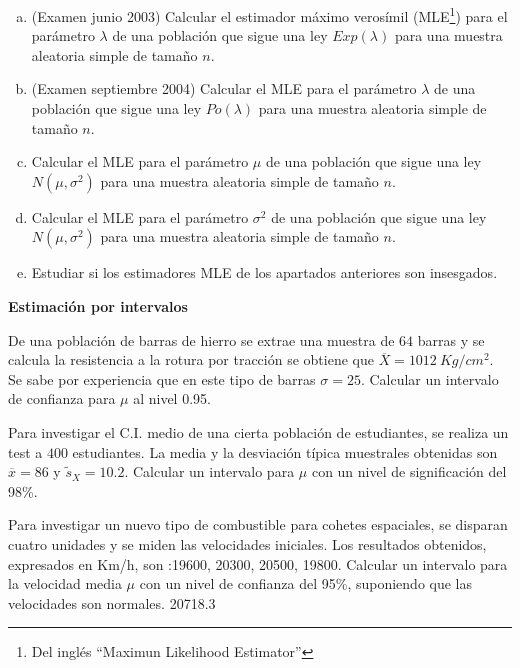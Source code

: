 \documentclass[12pt]{article}
\begin{document}
\begin{prob}
\begin{enumerate}[a)]
\item (Examen junio 2003) Calcular el estimador máximo verosímil (MLE\footnote{Del inglés
 ``Maximun Likelihood  Estimator''}) para el parámetro $\lambda$ de una población que
sigue una ley $Exp(\lambda)$ para una muestra aleatoria simple de tamaño $n$.
\item (Examen septiembre 2004) Calcular el MLE para el parámetro $\lambda$ de una población
que sigue una ley $Po(\lambda)$ para una muestra aleatoria simple de tamaño $n$.
\item  Calcular el MLE para el parámetro $\mu$ de una población
que sigue una ley $N(\mu,\sigma^2)$ para una muestra aleatoria simple de tamaño $n$.
\item  Calcular el MLE para el parámetro $\sigma^2$ de una población
que sigue una ley $N(\mu,\sigma^2)$ para una muestra aleatoria simple de tamaño $n$.
\item Estudiar si los estimadores MLE de los apartados anteriores son insesgados.
\end{enumerate}
\end{prob}




\textbf{Estimación por intervalos}

\begin{prob}
De una población de barras de hierro se extrae una muestra de $64$ barras y  se calcula la
resistencia a la rotura por tracción se obtiene que $\overline{X}=1012\ Kg/cm^{2}$. Se sabe
por experiencia que en este tipo de barras $\sigma=25$. Calcular un intervalo de confianza
para $\mu$ al nivel 0.95. 
\end{prob}

\begin{prob}
Para investigar el C.I. medio de una cierta población de estudiantes, se realiza un test a
$400$ estudiantes. La media y la desviación típica  muestrales obtenidas son
$\overline{x}=86$ y $\tilde{s}_{X}=10.2$. Calcular un intervalo para $\mu$ con un nivel de
significación del 98\%. 
\end{prob}

\begin{prob}
Para investigar un nuevo tipo de combustible para cohetes espaciales, se disparan cuatro
unidades y se miden las velocidades iniciales. Los resultados obtenidos, expresados en
Km/h, son :19600, 20300, 20500, 19800. Calcular un intervalo para la velocidad media $\mu$
con un nivel de confianza del 95\%, suponiendo que las velocidades son normales.
 20718.3
\end{prob}
\end{document}

